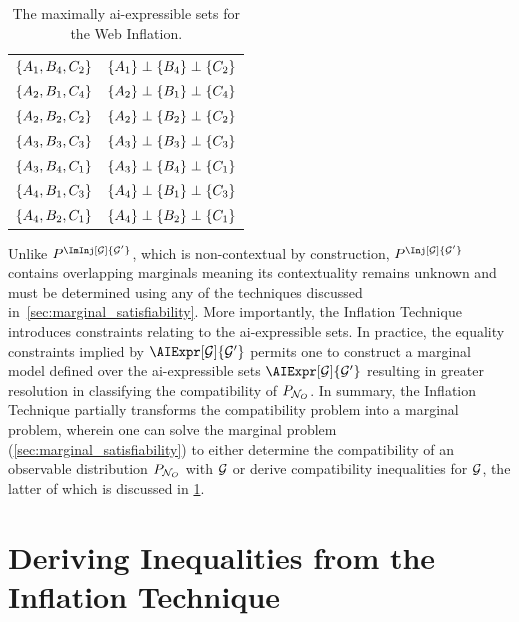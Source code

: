 \documentclass[aps, 10pt, english, twoside, pra, nofootinbib, tightenlines, longbibliography, superscriptaddress]{revtex4-1}
\begin{document}
\begin{nscenter}
\begin{table}
{\begin{tabular}{|c|c|}
                $\bc{A_1, B_4, C_2}$ & $\bc{A_1} \ancestralindep \bc{B_4} \ancestralindep \bc{C_2}$ \\
                $\bc{A_2, B_1, C_4}$ & $\bc{A_2} \ancestralindep \bc{B_1} \ancestralindep \bc{C_4}$ \\
                $\bc{A_2, B_2, C_2}$ & $\bc{A_2} \ancestralindep \bc{B_2} \ancestralindep \bc{C_2}$ \\
                $\bc{A_3, B_3, C_3}$ & $\bc{A_3} \ancestralindep \bc{B_3} \ancestralindep \bc{C_3}$ \\
                $\bc{A_3, B_4, C_1}$ & $\bc{A_3} \ancestralindep \bc{B_4} \ancestralindep \bc{C_1}$ \\
                $\bc{A_4, B_1, C_3}$ & $\bc{A_4} \ancestralindep \bc{B_1} \ancestralindep \bc{C_3}$ \\
                $\bc{A_4, B_2, C_1}$ & $\bc{A_4} \ancestralindep \bc{B_2} \ancestralindep \bc{C_1}$ \\
                \hline
            \end{tabular}
            \caption{The maximally ai-expressible sets for the Web Inflation.
            \label{tab:asexpr_triangle_structure_web}}
        }
        \end{table}
    \end{nscenter}

    Unlike $\prob^{\ImInj[\graph]{\graph'}}$, which is non-contextual by construction, $\prob^{\Inj[\graph]{\graph'}}$ contains overlapping marginals meaning its contextuality remains unknown and must be determined using any of the techniques discussed in~\cref{sec:marginal_satisfiability}. More importantly, the Inflation Technique introduces constraints relating to the ai-expressible sets. In practice, the equality constraints implied by $\AIExpr[\graph]{\graph'}$ permits one to construct a marginal model defined over the ai-expressible sets $\AIExpr[\graph]{\graph'}$ resulting in greater resolution in classifying the compatibility of $\prob[\nodes_O]$. In summary, the Inflation Technique partially transforms the compatibility problem into a marginal problem, wherein one can solve the marginal problem (\cref{sec:marginal_satisfiability}) to either determine the compatibility of an observable distribution $\prob[\nodes_O]$ with $\mathcal{G}$ or derive compatibility inequalities for $\mathcal{G}$, the latter of which is discussed in \cref{sec:deriving_inequalities}.

    \section{Deriving Inequalities from the Inflation Technique}
    \label{sec:deriving_inequalities}
\end{document}
